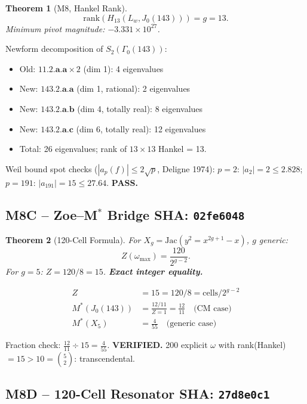 \documentclass[12pt,letterpaper]{article}
\newtheorem{theorem}{Theorem}[section]
\begin{document}
\begin{theorem}[M8, Hankel Rank]
\[
  \mathrm{rank}(H_{13}(L_w, J_0(143))) = g = 13.
\]
Minimum pivot magnitude: $-3.331 \times 10^{27}$.
\end{theorem}

Newform decomposition of $S_2(\Gamma_0(143))$:
\begin{itemize}
  \item Old: $\mathbf{11.2.a.a} \times 2$ (dim 1): 4 eigenvalues
  \item New: $\mathbf{143.2.a.a}$ (dim 1, rational): 2 eigenvalues
  \item New: $\mathbf{143.2.a.b}$ (dim 4, totally real): 8 eigenvalues
  \item New: $\mathbf{143.2.a.c}$ (dim 6, totally real): 12 eigenvalues
  \item Total: 26 eigenvalues; rank of $13 \times 13$ Hankel = 13.
\end{itemize}

Weil bound spot checks ($|a_p(f)| \leq 2\sqrt{p}$, Deligne 1974):
$p=2$: $|a_2| = 2 \leq 2.828$; $p=191$: $|a_{191}| = 15 \leq 27.64$. \textbf{PASS.}

\subsection{M8C -- Zoe--M$^*$ Bridge \hfill SHA: \texttt{02fe6048}}

\begin{theorem}[120-Cell Formula]
For $X_g = \mathrm{Jac}(y^2 = x^{2g+1} - x)$, $g$ generic:
\begin{equation}
  Z(\omega_{\max}) = \frac{120}{2^{g-2}}.
  \label{eq:Zcell}
\end{equation}
For $g = 5$: $Z = 120/8 = 15$. \textbf{Exact integer equality.}
\end{theorem}

\begin{align}
  Z &= 15 = 120/8 = \text{cells}/2^{g-2} \\
  M^*(J_0(143)) &= \frac{12/11}{Z=1} = \frac{12}{11}
    \quad\text{(CM case)} \\
  M^*(X_5) &= \frac{4}{55}
    \quad\text{(generic case)} \label{eq:Mstar_cases}
\end{align}

Fraction check: $\frac{12}{11} \div 15 = \frac{4}{55}$. \textbf{VERIFIED.}
200 explicit $\omega$ with rank(Hankel) $= 15 > 10 = \binom{5}{2}$: transcendental.

\subsection{M8D -- 120-Cell Resonator \hfill SHA: \texttt{27d8e0c1}}
\end{document}

